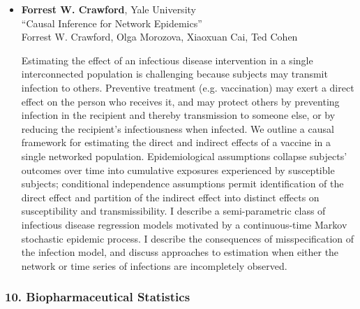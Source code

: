 \begin{itemize}
\item \textbf{Forrest W. Crawford}, Yale University \\
``Causal Inference for Network Epidemics'' \\
Forrest W. Crawford, Olga Morozova, Xiaoxuan Cai, Ted Cohen


Estimating the effect of an infectious disease intervention
in a single interconnected population is challenging because subjects
may transmit infection to others. Preventive treatment (e.g.
vaccination) may exert a direct effect on the person who receives it,
and may protect others by preventing infection in the recipient and
thereby transmission to someone else, or by reducing the recipient’s
infectiousness when infected. We outline a causal framework for
estimating the direct and indirect effects of a vaccine in a single
networked population. Epidemiological assumptions collapse subjects’
outcomes over time into cumulative exposures experienced by
susceptible subjects; conditional independence assumptions permit
identification of the direct effect and partition of the indirect
effect into distinct effects on susceptibility and transmissibility. I
describe a semi-parametric class of infectious disease regression
models motivated by a continuous-time Markov stochastic epidemic
process. I describe the consequences of misspecification of the
infection model, and discuss approaches to estimation when either the
network or time series of infections are incompletely observed.

\end{itemize}

\subsubsection*{10. Biopharmaceutical Statistics}

